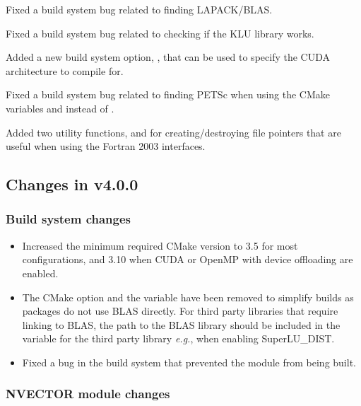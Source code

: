 Fixed a build system bug related to finding LAPACK/BLAS.

Fixed a build system bug related to checking if the KLU library works.

Added a new build system option, , that can be used to specify
the CUDA architecture to compile for.

Fixed a build system bug related to finding PETSc when using the CMake
variables  and  instead of
.

Added two utility functions,  and 
for creating/destroying file pointers that are useful when using the Fortran
2003 interfaces.

\subsection*{Changes in v4.0.0}

\subsubsection*{Build system changes}

\begin{itemize}
\item Increased the minimum required CMake version to 3.5 for most {\sundials}
configurations, and 3.10 when CUDA or OpenMP with device offloading are enabled.
%
\item The CMake option  and the variable  have
been removed to simplify builds as {\sundials} packages do not use BLAS
directly. For third party libraries that require linking to BLAS, the path to
the BLAS library should be included in the  variable for the
third party library \textit{e.g.},  when enabling
SuperLU\_DIST.
%
\item Fixed a bug in the build system that prevented the {\nvecpthreads} module from
being built.
\end{itemize}

\subsubsection*{NVECTOR module changes}

